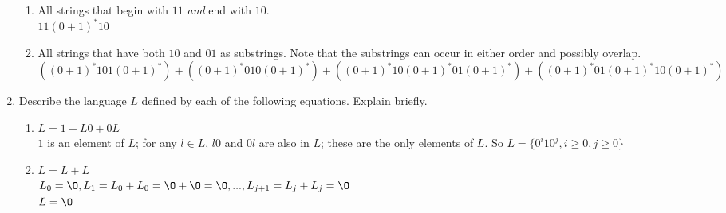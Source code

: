 \documentclass[11pt]{article}
\begin{document}
\begin{enumerate}
  \begin{enumerate}
  \item All strings that begin with $11$ \emph{and} end with $10$. \\
  $11(0+1)^{*}10$
  \item All strings that have both $10$ and $01$ as substrings. Note
    that the substrings can occur in either order and possibly
    overlap. \\
    $((0+1)^{*}101(0+1)^{*})+((0+1)^{*}010(0+1)^{*})+((0+1)^{*}10(0+1)^{*}01(0+1)^{*})+((0+1)^{*}01(0+1)^{*}10(0+1)^{*})$
  \end{enumerate}

\item Describe the language $L$ defined by each of the following
  equations.  Explain briefly.

  \begin{enumerate}
  \item $L = 1 + L0 + 0L$ \\
  $1$ is an element of $L$; for any $l \in L$, $l0$ and $0l$ are also in $L$; these are the only elements of $L$. So $L = \{ 0^{i}10^{j}, i \geq 0, j \geq 0 \}$
  \item $L = L + L$ \\
  $L_{0} = \O, L_1 = L_{0} + L_{0} = \O + \O = \O, ..., L_{j+1} = L_j + L_j = \O$\\
  $L = \O$
  \end{enumerate}
\end{enumerate}
\end{document}
